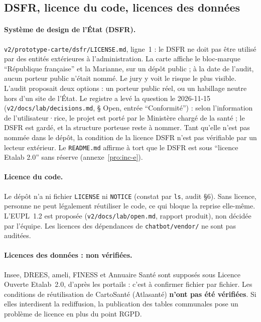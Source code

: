 \subsection{DSFR, licence du code, licences des données}\label{conf:licences}

\paragraph{Système de design de l'État (DSFR).}
\texttt{v2/\allowbreak{}prototype-\allowbreak{}carte/\allowbreak{}dsfr/\allowbreak{}LICENSE.md}, ligne~1 : le DSFR ne doit pas être utilisé par des entités extérieures à l'administration.
La carte affiche le bloc-marque \enquote{République française} et la Marianne, sur un dépôt public ; à la date de l'audit, aucun porteur public n'était nommé.
Le jury y voit le risque le plus visible.
L'audit proposait deux options : un porteur public réel, ou un habillage neutre hors d'un site de l'État.
Le registre a levé la question le 2026-11-15 (\texttt{v2/\allowbreak{}docs/\allowbreak{}lab/\allowbreak{}decisions.md}, § Open, entrée \enquote{Conformité}) : selon l'information de l'utilisateur·rice, le projet est porté par le Ministère chargé de la santé ; le DSFR est gardé, et la structure porteuse reste à nommer.
Tant qu'elle n'est pas nommée dans le dépôt, la condition de la licence DSFR n'est pas vérifiable par un lecteur extérieur.
Le \texttt{README.md} affirme à tort que le DSFR est sous \enquote{licence Etalab 2.0} sans réserve (annexe~\ref{pro:inc-e}).

\paragraph{Licence du code.}
Le dépôt n'a ni fichier \texttt{LICENSE} ni \texttt{NOTICE} (constat par \texttt{ls}, audit §6).
Sans licence, personne ne peut légalement réutiliser le code, ce qui bloque la reprise elle-même.
L'EUPL~1.2 est proposée (\texttt{v2/\allowbreak{}docs/\allowbreak{}lab/\allowbreak{}open.md}, rapport produit), non décidée par l'équipe.
Les licences des dépendances de \texttt{chatbot/\allowbreak{}vendor/\allowbreak{}} ne sont pas auditées.

\paragraph{Licences des données : non vérifiées.}
Insee, DREES, ameli, FINESS et Annuaire Santé sont supposés sous Licence Ouverte Etalab~2.0, d'après les portails : c'est à confirmer fichier par fichier.
Les conditions de réutilisation de CartoSanté (Atlasanté) \textbf{n'ont pas été vérifiées}. Si elles interdisent la rediffusion, la publication des tables communales pose un problème de licence en plus du point RGPD.

